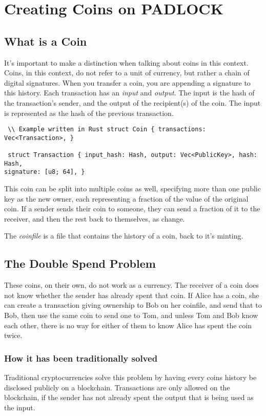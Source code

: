 \documentclass[12pt, letterpaper]{article} \usepackage[utf8]{inputenc}
\begin{document}
\section{Creating Coins on PADLOCK}

\subsection{What is a Coin} It's important to make a distinction when talking
about coins in this context. Coins, in this context, do not refer to a unit of
currency, but rather a chain of digital signatures. When you transfer a coin,
you are appending a signature to this history. Each transaction has an
\textit{input} and \textit{output}. The input is the hash of the transaction's
sender, and the output of the recipient(s) of the coin. The input is
represented as the hash of the previous transaction.

\begin{verbatim} \\ Example written in Rust struct Coin { transactions:
Vec<Transaction>, }

 struct Transaction { input_hash: Hash, output: Vec<PublicKey>, hash: Hash,
signature: [u8; 64], } \end{verbatim}

This coin can be split into multiple coins as well, specifying more than one
public key as the new owner, each representing a fraction of the value of the
original coin. If a sender sends their coin to someone, they can send a
fraction of it to the receiver, and then the rest back to themselves, as change.

The \textit{coinfile} is a file that contains the history of a coin, back to
it's minting.

\subsection{The Double Spend Problem} These coins, on their own, do not work as
a currency. The receiver of a coin does not know whether the sender has already
spent that coin. If Alice has a coin, she can create a transaction giving
ownership to Bob on her coinfile, and send that to Bob, then use the same coin
to send one to Tom, and unless Tom and Bob know each other, there is no way for
either of them to know Alice has spent the coin twice.

\subsubsection{How it has been traditionally solved} Traditional
cryptocurrencies solve this problem by having every coins history be disclosed
publicly on a blockchain. Transactions are only allowed on the blockchain, if
the sender has not already spent the output that is being used as the input.
\end{document}
